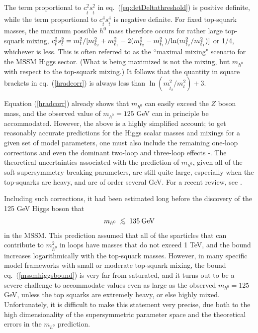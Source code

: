 \documentclass[11pt]{article}
\def\beq{\begin{eqnarray}}
\def\eeq{\end{eqnarray}}
\def\centeron#1#2{{\setbox0=\hbox{#1}\setbox1=\hbox{#2}\ifdim
\wd1>\wd0\kern.5\wd1\kern-.5\wd0\fi
\copy0\kern-.5\wd0\kern-.5\wd1\copy1\ifdim\wd0>\wd1
\kern.5\wd0\kern-.5\wd1\fi}}
\def\ltap{\;\centeron{\raise.35ex\hbox{$<$}}{\lower.65ex\hbox{$\sim$}}\;}
\def\lsim{\mathrel{\ltap}}
\begin{document}
The term proportional to $c_{\tilde t}^2 s_{\tilde t}^2$ 
in eq.~(\ref{eq:detDeltathreshold}) is positive definite, 
while the term proportional to $c_{\tilde t}^4 s_{\tilde t}^4$ is negative definite. 
For fixed top-squark masses, the maximum possible $h^0$ mass therefore
occurs for rather large top-squark mixing, 
$c_{\tilde t}^2 s_{\tilde t}^2  = m_t^2/[m_{\tilde t_2}^2 + m_{\tilde t_1}^2
- 2 (m_{\tilde t_2}^2 - m_{\tilde t_1}^2)/{\rm ln}(m_{\tilde t_2}^2/m_{\tilde t_1}^2)
]$ or 1/4, whichever is less. This is often referred to as the ``maximal mixing" 
scenario for the MSSM Higgs sector. (What is being maximized 
is not the mixing, but $m_{h^0}$ with respect to the top-squark mixing.) 
It follows that the quantity in 
square brackets in eq.~(\ref{hradcorr}) is always less than 
$\ln(m_{\tilde t_2}^2/m_t^2) + 3$.

Equation (\ref{hradcorr}) already shows that $m_{h^0}$ 
can easily exceed the $Z$ boson mass, and the 
observed value of $m_{h^0} = 125$ GeV can in principle be accommodated. However, 
the above is a highly simplified account; to get reasonably accurate predictions for the Higgs scalar masses and mixings
for a given set of model parameters, one must also include
the remaining one-loop corrections and even the dominant two-loop and three-loop
effects
\cite{hcorrections}-\cite{Vega:2015fna}.
The theoretical 
uncertainties associated with the prediction of $m_{h^0}$, given all of the 
soft supersymmetry breaking parameters, are still quite large, especially
when the top-squarks are heavy, and are of order several GeV.
For a recent review, see \cite{DraperRzehak}.

Including such corrections, it had been estimated long
before the discovery of the 125 GeV Higgs boson that 
\beq
m_{h^0} \lsim 135\>{\rm GeV}
\label{mssmhiggsbound}
\eeq
in the MSSM. This prediction assumed that all of the sparticles that can contribute 
to $m_{h^0}^2$ in loops have masses that do not exceed 1 TeV, 
and the bound increases logarithmically with the top-squark masses. 
However, in many specific model
frameworks with small or moderate top-squark mixing,
the bound eq.~(\ref{mssmhiggsbound}) is very far from saturated, and 
it turns out to be a severe challenge to accommodate values even as large as the observed 
$m_{h^0} = 125$ GeV, unless the top squarks are extremely heavy, or else highly mixed. 
Unfortunately, it is difficult to make this statement very 
precise, due both to the high dimensionality of the 
supersymmetric parameter space and the theoretical errors in the $m_{h^0}$ prediction.
\end{document}
